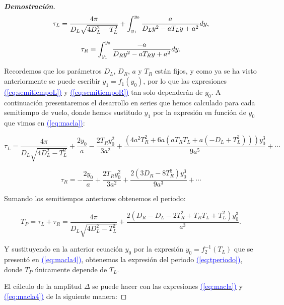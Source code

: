 \documentclass[12pt,a4paper]{report} %
\newcommand{\eref}[1]{\hyperref[#1]{\textcolor{blue}{(\ref*{#1})}}}
\begin{document}
\begin{proof}[\textbf{Demostración}]
		\begin{equation}
			\label{eq:semitiempoL}
			\scalebox{1}{$\displaystyle
				\tau_L=\frac{4\pi}{D_L\sqrt{4D_L^2-T_L^2}}+\int_{y_1}^{y_0}\frac{a}{D_Ly^2-aT_Ly+a^2}dy,
				$}
		\end{equation}\smallskip
		
		\begin{equation}
			\label{eq:semitiempoR}
			\scalebox{1}{$\displaystyle
				\tau_R=\int_{y_1}^{y_0}\frac{-a}{D_Ry^2-aT_Ry+a^2}dy.
				$}
		\end{equation}\smallskip
	
	\noindent Recordemos que los parámetros $D_L$, $D_R$, $a$ y $T_R$ están fijos, y como ya se ha visto  anteriormente se puede escribir $y_1=f_1(y_0)$, por lo que las expresiones \eref{eq:semitiempoL} y \eref{eq:semitiempoR} tan solo dependerán de $y_0$. A continuación presentaremos el desarrollo en series que hemos calculado para cada semitiempo de vuelo, donde hemos sustitudo $y_1$ por la expresión en función de $y_0$ que vimos en \eref{eq:macla}:
	
	\begin{equation}
		\label{eq:seriestL}
		\tau_L=\frac{4\pi}{D_L\sqrt{4D_L^2-T_L^2}}+\frac{2y_0}{a}-\frac{2T_Ry_0^2}{3a^2}+\frac{(4a^2T_R^2+6a(aT_RT_L+a(-D_L+T_L^2)))y_0^3}{9a^5}+\cdots
	\end{equation}\smallskip
	
	\begin{equation}
		\label{eq:seriestR}
		\tau_R=-\frac{2y_0}{a}+\frac{2T_Ry_0^2}{3a^2}+\frac{2(3D_R-8T_R^2)y_0^3}{9a^3}+\cdots
	\end{equation}\smallskip
	
\noindent Sumando los semitiempos anteriores obtenemos el periodo:
	
	\begin{equation}
		T_P=\tau_L + \tau_R = \frac{4\pi}{D_L\sqrt{4D_L^2-T_L^2}}+\frac{2(D_R-D_L-2T_R^2+T_RT_L+T_L^2)y_0^3}{a^3}.
	\end{equation}\smallskip
	
	\noindent Y sustituyendo en la anterior ecuación $y_0$ por la expresión $y_0=f_2^{-1}(T_L)$ que se presentó en \eref{eq:macla4}, obtenemos la expresión del periodo \eref{eq:tperiodo}, donde $T_P$ únicamente depende de $T_L$.
	
 	\vspace{0.5cm}El cálculo de la amplitud $\varDelta$ se puede hacer con las expresiones \eref{eq:macla} y \eref{eq:macla4} de la siguiente manera:
	

\end{proof}
\end{document}
